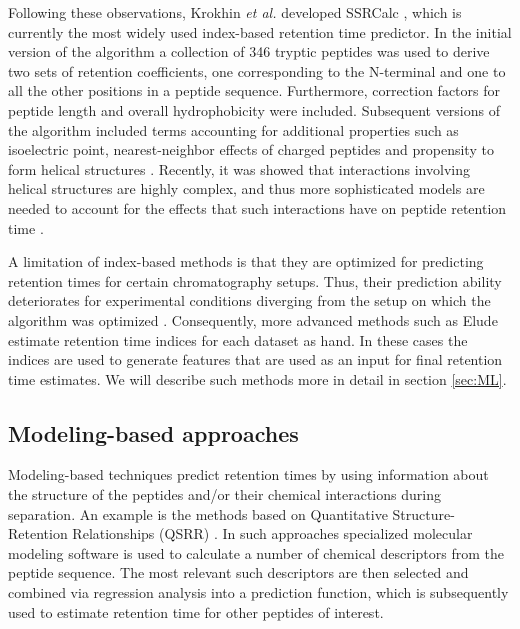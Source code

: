 \documentclass[a4paper]{article}
\begin{document}
Following these observations, Krokhin {\em et al.} developed {\sc
SSRCalc} \cite{Krokhin2004}, which is currently the most widely used
index-based retention time predictor. In the initial version of the
algorithm a collection of 346 tryptic peptides was used to derive two
sets of retention coefficients, one corresponding to the N-terminal
and one to all the other positions in a peptide sequence. Furthermore,
correction factors for peptide length and overall hydrophobicity were
included. Subsequent versions of the algorithm included terms
accounting for additional properties such as isoelectric point,
nearest-neighbor effects of charged peptides and propensity to form
helical structures \cite{Krokhin2006}. Recently, it was showed that
interactions involving helical structures are highly complex, and thus
more sophisticated models are needed to account for the effects that
such interactions have on peptide retention time \cite{ah}.

A limitation of index-based methods is that they are optimized for
predicting retention times for certain chromatography setups. Thus,
their prediction ability deteriorates for experimental conditions
diverging from the setup on which the algorithm was optimized
\cite{Spicer2007}. Consequently, more advanced methods such as {\sc
  Elude} \cite{elude1,elude2} estimate retention time indices for each
dataset as hand. In these cases the indices are used to generate
features that are used as an input for final retention time
estimates. We will describe such methods more in detail in section
\ref{sec:ML}.


\subsection{Modeling-based approaches}

Modeling-based techniques predict retention times by using information
about the structure of the peptides and/or their chemical interactions
during separation. An example is the methods based on Quantitative
Structure-Retention Relationships (QSRR) \cite{Kaliszan2005,
Baczek2005}. In such approaches specialized molecular modeling
software is used to calculate a number of chemical descriptors from
the peptide sequence. The most relevant such descriptors are then
selected and combined via regression analysis into a prediction
function, which is subsequently used to estimate retention time for
other peptides of interest.
\end{document}
